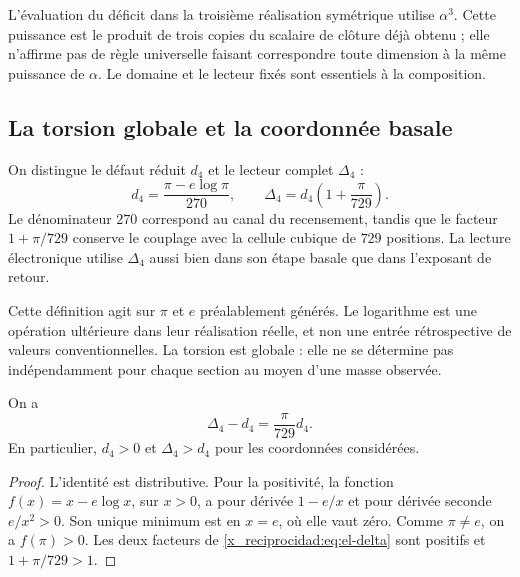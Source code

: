 L'évaluation du déficit dans la troisième réalisation symétrique utilise
\(\alpha^3\). Cette puissance est le produit de trois copies du scalaire
de clôture déjà obtenu ; elle n'affirme pas de règle universelle faisant
correspondre toute dimension à la même puissance de \(\alpha\).
Le domaine et le lecteur fixés sont essentiels à la composition.

\subsection{La torsion globale et la coordonnée basale}

\begin{definition}
On distingue le défaut réduit \(d_4\) et le lecteur complet
\(\Delta_4\) :
\begin{equation}
 d_4=\frac{\pi-e\log\pi}{270},\qquad
 \Delta_4=d_4\left(1+\frac{\pi}{729}\right).
 \label{x_reciprocidad:eq:el-delta}
\end{equation}
Le dénominateur \(270\) correspond au canal du recensement, tandis que le facteur \(1+\pi/729\) conserve le couplage avec la cellule cubique de \(729\) positions. La lecture électronique utilise \(\Delta_4\) aussi bien dans son étape basale que dans l'exposant de retour.
\end{definition}

Cette définition agit sur \(\pi\) et \(e\) préalablement générés. Le
logarithme est une opération ultérieure dans leur réalisation réelle, et non une
entrée rétrospective de valeurs conventionnelles. La torsion est globale :
elle ne se détermine pas indépendamment pour chaque section au moyen d'une masse
observée.

\begin{lemma}
On a
\begin{equation}
 \Delta_4-d_4=\frac{\pi}{729}d_4.
 \label{x_reciprocidad:eq:el-delta-diferencia}
\end{equation}
En particulier, \(d_4>0\) et \(\Delta_4>d_4\) pour les coordonnées
considérées.
\end{lemma}
\begin{proof}
L'identité est distributive. Pour la positivité, la fonction
\(f(x)=x-e\log x\), sur \(x>0\), a pour dérivée \(1-e/x\) et
pour dérivée seconde \(e/x^2>0\). Son unique minimum est en \(x=e\), où
elle vaut zéro. Comme \(\pi\ne e\), on a \(f(\pi)>0\). Les deux facteurs
de \eqref{x_reciprocidad:eq:el-delta} sont positifs et \(1+\pi/729>1\).
\end{proof}

